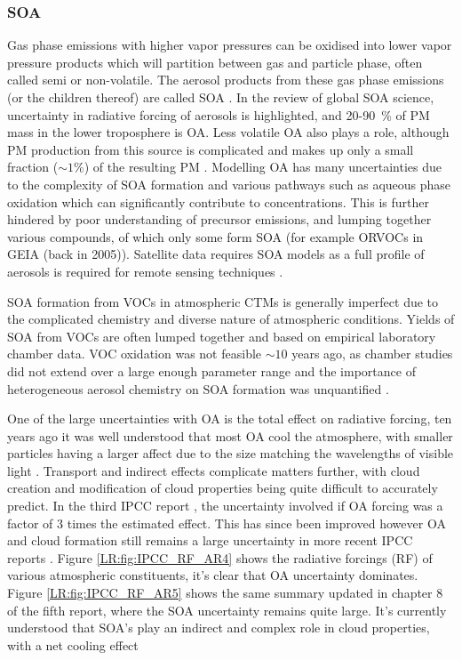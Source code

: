     
    \subsubsection{SOA}
      \label{LR:sec:SOA}
      Gas phase emissions with higher vapor pressures can be oxidised into lower vapor pressure products which will partition between gas and particle phase, often called semi or non-volatile. 
 	    The aerosol products from these gas phase emissions (or the children thereof) are called SOA \citep{Kanakidou2005}.
      In the \cite{Kanakidou2005} review of global SOA science, uncertainty in radiative forcing of aerosols is highlighted, and 20-90~\% of PM mass in the lower troposphere is OA.
      Less volatile OA also plays a role, although PM production from this source is complicated and makes up only a small fraction ($\sim 1 \%$) of the resulting PM \citep{Kroll2008,Bei2012}.
      Modelling OA has many uncertainties due to the complexity of SOA formation and various pathways such as aqueous phase oxidation which can significantly contribute to concentrations.
      This is further hindered by poor understanding of precursor emissions, and lumping together various compounds, of which only some form SOA (for example ORVOCs in GEIA (back in 2005)).
      Satellite data requires SOA models as a full profile of aerosols is required for remote sensing techniques \citep{Kanakidou2005}.
      
      SOA formation from VOCs in atmospheric CTMs is generally imperfect due to the complicated chemistry and diverse nature of atmospheric conditions.
      Yields of SOA from VOCs are often lumped together and based on empirical laboratory chamber data. 
      VOC oxidation was not feasible $\sim 10$ years ago,  as chamber studies did not extend over a large enough parameter range and the importance of heterogeneous aerosol chemistry on SOA formation was unquantified \citep{Kanakidou2005}.
      
      One of the large uncertainties with OA is the total effect on radiative forcing, ten years ago it was well understood that most OA cool the atmosphere, with smaller particles having a larger affect due to the size matching the wavelengths of visible light \citep{Kanakidou2005}. 
      Transport and indirect effects complicate matters further, with cloud creation and modification of cloud properties being quite difficult to accurately predict.
      In the third IPCC report \citep{IPCC2001}, the uncertainty involved if OA forcing was a factor of 3 times the estimated effect. 
      This has since been improved however OA and cloud formation still remains a large uncertainty in more recent IPCC reports \citep{IPCC_Chapter2}.
      Figure \ref{LR:fig:IPCC_RF_AR4} shows the radiative forcings (RF) of various atmospheric constituents, it's clear that OA uncertainty dominates.
      Figure \ref{LR:fig:IPCC_RF_AR5} shows the same summary updated in chapter 8 of the fifth report, where the SOA uncertainty remains quite large.
      It's currently understood that SOA's play an indirect and complex role in cloud properties, with a net cooling effect \citep[Chapter 7,8]{IPCC_AR5_WG1}
      
